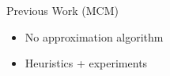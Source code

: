 \begin{frame}[<+->]{Previous Work (MCM)}
\begin{itemize}
  \item No approximation algorithm
  \item Heuristics + experiments
\end{itemize}
\end{frame}